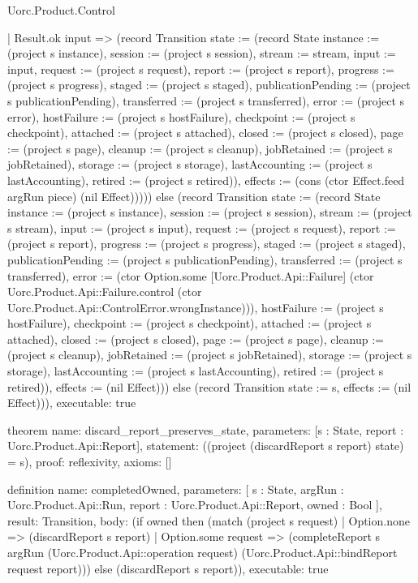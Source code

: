 \begin{lexlean}{Uorc.Product.Control}
\begin{semanticmodule}
{      | Result.ok input => (record Transition {state := (record State {instance := (project s instance), session := (project s session), stream := stream, input := input, request := (project s request), report := (project s report), progress := (project s progress), staged := (project s staged), publicationPending := (project s publicationPending), transferred := (project s transferred), error := (project s error), hostFailure := (project s hostFailure), checkpoint := (project s checkpoint), attached := (project s attached), closed := (project s closed), page := (project s page), cleanup := (project s cleanup), jobRetained := (project s jobRetained), storage := (project s storage), lastAccounting := (project s lastAccounting), retired := (project s retired)}), effects := (cons (ctor Effect.feed argRun piece) (nil Effect))}))) else (record Transition {state := (record State {instance := (project s instance), session := (project s session), stream := (project s stream), input := (project s input), request := (project s request), report := (project s report), progress := (project s progress), staged := (project s staged), publicationPending := (project s publicationPending), transferred := (project s transferred), error := (ctor Option.some [Uorc.Product.Api::Failure] (ctor Uorc.Product.Api::Failure.control (ctor Uorc.Product.Api::ControlError.wrongInstance))), hostFailure := (project s hostFailure), checkpoint := (project s checkpoint), attached := (project s attached), closed := (project s closed), page := (project s page), cleanup := (project s cleanup), jobRetained := (project s jobRetained), storage := (project s storage), lastAccounting := (project s lastAccounting), retired := (project s retired)}), effects := (nil Effect)})) else (record Transition {state := s, effects := (nil Effect)})),
  executable: true
}

theorem{
  name: discard_report_preserves_state,
  parameters: [s : State, report : Uorc.Product.Api::Report],
  statement: ((project (discardReport s report) state) = s),
  proof: reflexivity{},
  axioms: []
}

definition{
  name: completedOwned,
  parameters: [
    s : State,
    argRun : Uorc.Product.Api::Run,
    report : Uorc.Product.Api::Report,
    owned : Bool
  ],
  result: Transition,
  body: (if owned then (match (project s request)
    | Option.none => (discardReport s report)
    | Option.some request => (completeReport s argRun (Uorc.Product.Api::operation request) (Uorc.Product.Api::bindReport request report))) else (discardReport s report)),
  executable: true
}


\end{semanticmodule}
\end{lexlean}
